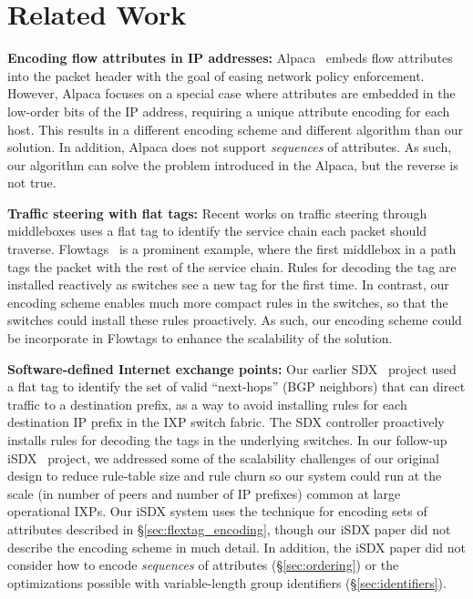 \section{Related Work} 
\label{sec:related}

\textbf{Encoding flow attributes in IP addresses:} Alpaca~\cite{alpaca} embeds flow attributes into the packet header with the goal of easing network policy enforcement.  However, Alpaca focuses on a special case where attributes are embedded in the low-order bits of the IP address, requiring a unique attribute encoding for each host.  This results in a different encoding scheme and different algorithm than our solution.  In addition, Alpaca does not support \emph{sequences} of attributes.  As such, our algorithm can solve the problem introduced in the Alpaca, but the reverse is not true.

\textbf{Traffic steering with flat tags:} Recent works on traffic steering through middleboxes uses a flat tag to identify the service chain each packet should traverse.  Flowtags~\cite{flowtags} is a prominent example, where the first middlebox in a path tags the packet with the rest of the service chain.  Rules for decoding the tag are installed reactively as switches see a new tag for the first time.  In contrast, our encoding scheme enables much more compact rules in the switches, so that the switches could install these rules proactively.  As such, our encoding scheme could be incorporate in Flowtags to enhance the scalability of the solution.

\textbf{Software-defined Internet exchange points:} Our earlier SDX~\cite{sdx} project used a flat tag to identify the set of valid ``next-hops'' (BGP neighbors) that can direct traffic to a destination prefix, as a way to avoid installing rules for each destination IP prefix in the IXP switch fabric.  The SDX controller proactively installs rules for decoding the tags in the underlying switches.  In our follow-up iSDX~\cite{isdx} project, we addressed some of the scalability challenges of our original design to reduce rule-table size and rule churn so our system could run at the scale (in number of peers and number of IP prefixes) common at large operational IXPs.  Our iSDX system uses the technique for encoding sets of attributes described in \S\ref{sec:flextag_encoding}, though our iSDX paper did not describe the encoding scheme in much detail.  In addition, the iSDX paper did not consider how to encode \emph{sequences} of attributes (\S\ref{sec:ordering}) or the optimizations possible with variable-length group identifiers (\S\ref{sec:identifiers}).


